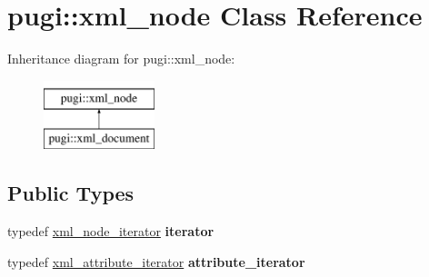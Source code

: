 \hypertarget{classpugi_1_1xml__node}{}\section{pugi\+:\+:xml\+\_\+node Class Reference}
\label{classpugi_1_1xml__node}
Inheritance diagram for pugi\+:\+:xml\+\_\+node\+:\begin{figure}[H]
\begin{center}
\leavevmode
\includegraphics[height=2.000000cm]{classpugi_1_1xml__node}
\end{center}
\end{figure}
\subsection*{Public Types}
\begin{DoxyCompactItemize}
\item 
\mbox{\label{classpugi_1_1xml__node_ae053ea39add5a64de584f7a81212e388}} 
typedef \hyperlink{classpugi_1_1xml__node__iterator}{xml\+\_\+node\+\_\+iterator} {\bfseries iterator}
\item 
\mbox{\label{classpugi_1_1xml__node_a9084f97350ffc64af1eaf7c17c57f4ba}} 
typedef \hyperlink{classpugi_1_1xml__attribute__iterator}{xml\+\_\+attribute\+\_\+iterator} {\bfseries attribute\+\_\+iterator}
\end{DoxyCompactItemize}
